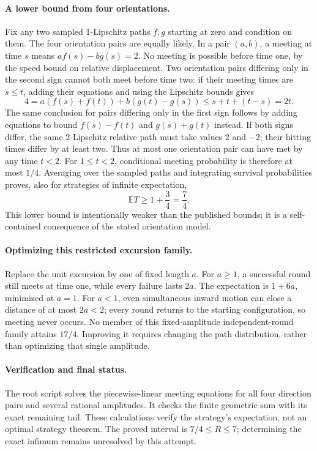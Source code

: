 \documentclass[11pt,a4paper]{article}
\begin{document}
\paragraph{A lower bound from four orientations.}
Fix any two sampled 1-Lipschitz paths $f,g$ starting
at zero and condition on them. The four orientation
pairs are equally likely. In a pair $(a,b)$, a
meeting at time $s$ means $af(s)-bg(s)=2$.
No meeting is possible before time one, by the
speed bound on relative displacement.
Two orientation pairs differing only in the second
sign cannot both meet before time two: if their
meeting times are $s\le t$, adding their equations
and using the Lipschitz bounds gives
\[
 4=a(f(s)+f(t))+b(g(t)-g(s))\le s+t+(t-s)=2t.
\]
The same conclusion for pairs differing only in
the first sign follows by adding equations to
bound $f(s)-f(t)$ and $g(s)+g(t)$ instead.
If both signs differ, the same 2-Lipschitz relative
path must take values $2$ and $-2$; their hitting
times differ by at least two. Thus at most one
orientation pair can have met by any time $t<2$.
For $1\le t<2$, conditional meeting probability
is therefore at most $1/4$. Averaging over the
sampled paths and integrating survival probabilities
proves, also for strategies of infinite expectation,
\[
             \mathbb E T\ge1+\frac34=\frac74.
\]
This lower bound is intentionally weaker than the
published bounds; it is a self-contained consequence
of the stated orientation model.

\paragraph{Optimizing this restricted excursion family.}
Replace the unit excursion by one of fixed length
$a$. For $a\ge1$, a successful round still meets
at time one, while every failure lasts $2a$.
The expectation is $1+6a$, minimized at $a=1$.
For $a<1$, even simultaneous inward motion can
close a distance of at most $2a<2$; every round
returns to the starting configuration, so meeting
never occurs. No member of this fixed-amplitude
independent-round family attains $17/4$.
Improving it requires changing the path distribution,
rather than optimizing that single amplitude.

\paragraph{Verification and final status.}
The root script solves the piecewise-linear meeting
equations for all four direction pairs and several
rational amplitudes. It checks the finite geometric
sum with its exact remaining tail. These calculations
verify the strategy's expectation, not an optimal
strategy theorem. The proved interval is
$7/4\le R\le7$; determining the exact infimum
remains unresolved by this attempt.
\end{document}
